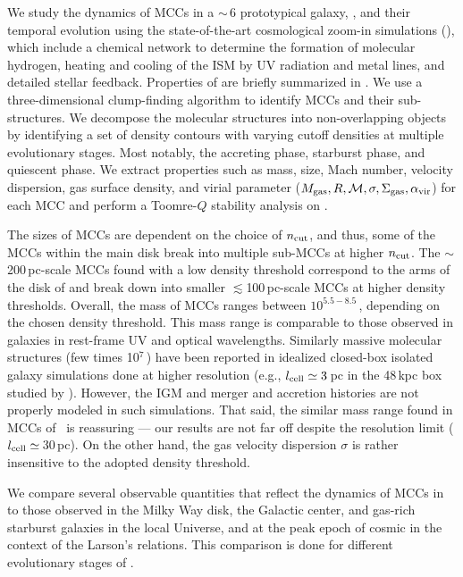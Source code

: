 \IfFileExists{emulateapjlegacy.cls}{\documentclass[iop]{emulateapjlegacy}}{\documentclass[iop]{emulateapj}}
\begin{document}
We study the dynamics of MCCs in a \z$\sim$\,6 prototypical galaxy, \flower,
and their temporal evolution using the state-of-the-art cosmological zoom-in simulations (),
which include a chemical network to determine the formation of molecular hydrogen, heating and cooling of the ISM by
UV radiation and metal lines, and detailed stellar feedback.
Properties of \flower are briefly summarized in .
We use a three-dimensional clump-finding algorithm to identify MCCs and their sub-structures. 
We decompose the molecular structures into non-overlapping objects by identifying a set of 
density contours with varying cutoff densities at multiple evolutionary stages. 
Most notably, the accreting phase, starburst phase, and quiescent phase. 
We extract properties such as mass, size, Mach number, velocity
dispersion, gas surface density, and virial parameter ($M_{\rm gas}, R, \mathcal{M}, 
\sigma, \Sigma_{\rm gas}, \alpha_{\rm vir}$) for each MCC and perform a Toomre-$Q$ stability analysis on \flower.


The sizes of MCCs are dependent on the choice of $n_{\rm cut}$, 
and thus, some of the MCCs within the main disk break into multiple sub-MCCs at higher $n_{\rm cut}$. 
The $\sim$200\,pc-scale MCCs found with a low density threshold
correspond to the arms of the disk of \flower and break down into smaller $\lesssim$100\,pc-scale MCCs at higher density thresholds.
Overall, the mass of MCCs ranges between $10^{5.5-8.5}$\,\Msun, depending on the chosen density threshold.
This mass range is comparable to those observed in \z{} galaxies in rest-frame UV and optical wavelengths.
Similarly massive molecular structures (few times 10$^7$\,\Msun) have been 
reported in idealized closed-box isolated galaxy simulations done at higher resolution (e.g., $l_{\rm cell}\simeq3$\,pc in the 
48\,kpc box studied by \citealt{Behrendt16a}). 
However, the IGM and merger and accretion histories are not properly modeled in such simulations. 
That said, the similar mass range found in MCCs of \flower\ is
reassuring --- our results are not far off despite the resolution limit ($l_{\rm cell}\simeq$\,30\,pc).
On the other hand, the gas velocity dispersion $\sigma$ is rather insensitive to the adopted density threshold.

We compare several observable quantities that reflect the dynamics of MCCs in \flower to those
observed in the Milky Way disk, the Galactic center, and 
gas-rich starburst galaxies in the local Universe, and at the peak epoch of cosmic \SF in the context of the Larson's relations. 
This comparison is done for different evolutionary stages of \flower.
\end{document}
